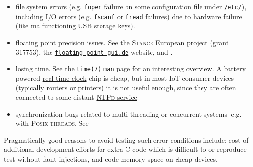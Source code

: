 {{\begin{itemize}
 \item file system  errors (e.g. \texttt{fopen}
   failure on some  
    configuration
   file under \texttt{/etc/}), including I/O errors 
     (e.g. \texttt{fscanf} or \texttt{fread} failures) due
    to hardware failure (like malfunctioning USB
   storage keys).

     \item floating point  precision
       issues.  See the  \href{http://www.stance-project.eu/}{\textsc{Stance}
         European project} (grant 317753), the
       \href{https://floating-point-gui.de/}{\texttt{floating-point-gui.de}}
       website, and \cite{Kiss:2015:combining, goubault:2011:static}.

     \item losing  time. See the
       \href{https://man7.org/linux/man-pages/man7/time.7.html}{\texttt{time(7)}}
       \texttt{man} page for an interesting overview. A battery
       powered 
       \href{https://en.wikipedia.org/wiki/Real-time_clock}{real-time
         clock} chip is cheap, but in most IoT consumer devices
       (typically routers or printers) it is not useful enough, since
       they are often connected to some distant
       \href{https://en.wikipedia.org/wiki/Ntpd}{\textsc{NTPd}
         service}

       \item synchronization bugs related to multi-threading or concurrent systems, e.g. with \textsc{Posix threads}, See \cite{goubault:2005:practical, sangiorgi:2003:pi, david:2013:everything, guerraoui:2018:concurrent-systems}
 \end{itemize}

 Pragmatically good reasons to avoid testing such error conditions
  include: cost of additional development
 efforts for extra C code which is difficult to or reproduce
    test
 without fault injections, and code memory space 
  on cheap devices.

}}
